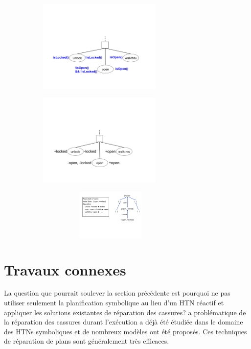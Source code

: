 \documentclass[a4paper,twoside,french]{article}
\begin{document}
			\begin{figure}[t]
				\centering
				\begin{subfigure}{2.3in}
					\centerline{\includegraphics[width=2.4in]{figs/procedures}}
					\vskip 8pt 
				\end{subfigure}
				\hfill
				\begin{subfigure}{2.3in}
					\centerline{\includegraphics[width=2.4in]{figs/features}}
					\vskip 8pt 
				\end{subfigure}
				\vskip 8pt
			\end{figure}
	
		\begin{figure}[]
			\centerline{\includegraphics[width=3.7in, height=1in]{figs/planning}}
			\vskip 8pt
		\end{figure}
		 
		
		\section {Travaux connexes}
		La question que pourrait soulever la section précédente est pourquoi ne pas utiliser seulement la planification symbolique au lieu d'un HTN réactif et appliquer les solutions existantes de réparation des cassures? a problématique de la réparation des cassures durant l'exécution a déjà été étudiée dans le domaine des HTNs symboliques et de nombreux modèles ont été proposés\cite{boella2002replanning,van2005plan,ayan2007hotride,warfield2007adaptation}. Ces techniques de réparation de plans sont généralement très efficaces.
\end{document}
